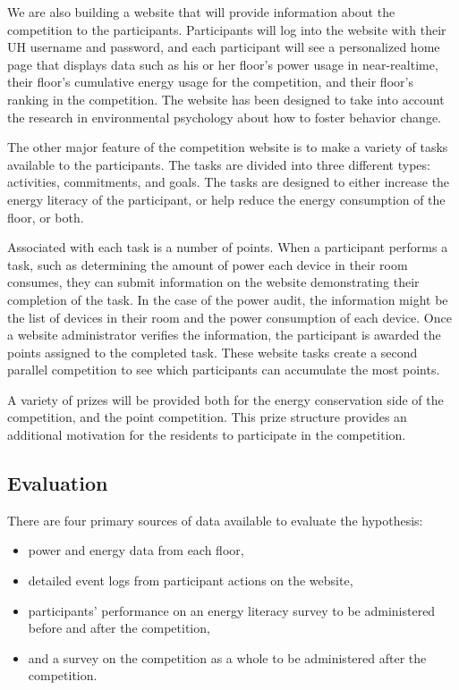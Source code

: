 We are also building a website that will provide information about the competition to the participants. Participants will log into the website with their UH username and password, and each participant will see a personalized home page that displays data such as his or her floor's power usage in near-realtime, their floor's cumulative energy usage for the competition, and their floor's ranking in the competition. The website has been designed to take into account the research in environmental psychology about how to foster behavior change.

The other major feature of the competition website is to make a variety of tasks available to the participants. The tasks are divided into three different types: activities, commitments, and goals. The tasks are designed to either increase the energy literacy of the participant, or help reduce the energy consumption of the floor, or both.

Associated with each task is a number of points. When a participant performs a task, such as determining the amount of power each device in their room consumes, they can submit information on the website demonstrating their completion of the task. In the case of the power audit, the information might be the list of devices in their room and the power consumption of each device. Once a website administrator verifies the information, the participant is awarded the points assigned to the completed task. These website tasks create a second parallel competition to see which participants can accumulate the most points.

A variety of prizes will be provided both for the energy conservation side of the competition, and the point competition. This prize structure provides an additional motivation for the residents to participate in the competition.

\subsection{Evaluation}

There are four primary sources of data available to evaluate the hypothesis:

\begin{itemize}
	\item power and energy data from each floor,
	\item detailed event logs from participant actions on the website,
	\item participants' performance on an energy literacy survey to be administered before and after the competition,
	\item and a survey on the competition as a whole to be administered after the competition.
\end{itemize}

